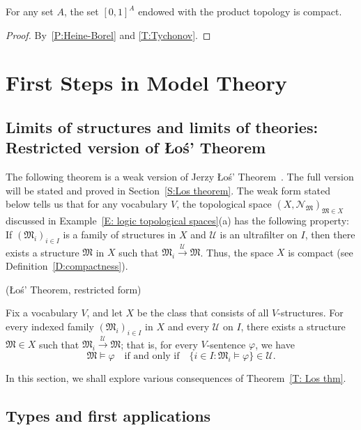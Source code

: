 \documentclass{scrartcl}
\begin{document}
\begin{corollary}
For any set $A$, the set $[0,1]^A$ endowed with the product topology is compact. 
\end{corollary}

\begin{proof}
By~\ref{P:Heine-Borel} and \ref{T:Tychonov}.
\end{proof}

\section{First Steps in Model Theory}

\subsection{Limits of structures and limits of theories: Restricted version of \L o\'s' Theorem}

The following theorem is a weak version of Jerzy \L o\'s' Theorem~\cite{Los:1955}. The full version will be stated and proved in Section~\ref{S:Los theorem}. The weak form stated below tells us that for any vocabulary $V$, the topological space $(X,\mathscr{N}_\mathfrak{M})_{\mathfrak{M}\in X}$ discussed in Example~\ref{E: logic topological spaces}(a) has the following property: If $(\mathfrak{M}_i)_{i\in I}$ is a family of structures in $X$ and $\mathscr{U}$ is an ultrafilter on $I$, then there exists a structure $\mathfrak{M}$ in $X$ such that $\mathfrak{M}_i\overset{\mathscr{U}}\to \mathfrak{M}$. Thus, the space $X$ is compact (see Definition~\ref{D:compactness}).


\begin{theorem} (\L o\'s' Theorem, restricted form)
\label{T: Los thm}

Fix a vocabulary $V$, and let $X$ be the class that consists of all $V$-structures. For every indexed family $(\mathfrak{M}_i)_{i\in I}$ in $X$ and every $\mathscr{U}$ on $I$, there exists a structure $\mathfrak{M}\in X$ such that $\mathfrak{M}_i\overset{\mathscr{U}}\to \mathfrak{M}$; that is, for every $V$-sentence $\varphi$, we have 
\[
\mathfrak{M}\models \varphi 
\quad
\text{if and only if} 
\quad
\{i\in I\colon \mathfrak{M}_i\models\varphi\}\in\mathscr{U}.
\]
\end{theorem}


In this section, we shall explore various consequences of Theorem~\ref{T: Los thm}.


\subsection{Types and first applications}
\label{S:types}
\end{document}
